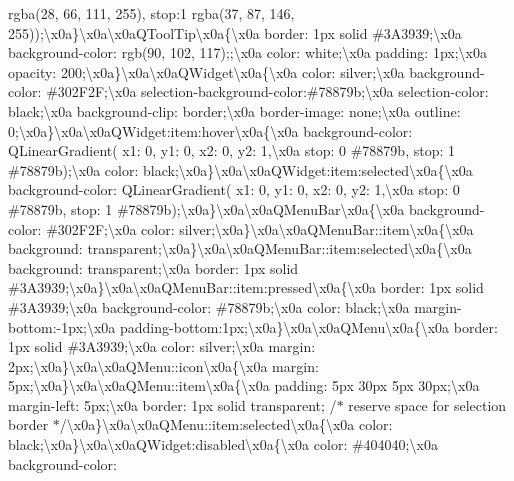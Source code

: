\begin{DoxyCompactItemize}
rgba(28, 66, 111, 255), stop\+:1 rgba(37, 87, 146, 255));\textbackslash{}x0a\}\textbackslash{}x0a\textbackslash{}x0a\+Q\+Tool\+Tip\textbackslash{}x0a\{\textbackslash{}x0a border\+: 1px solid \#3\+A3939;\textbackslash{}x0a background-\/color\+: rgb(90, 102, 117);;\textbackslash{}x0a color\+: white;\textbackslash{}x0a padding\+: 1px;\textbackslash{}x0a opacity\+: 200;\textbackslash{}x0a\}\textbackslash{}x0a\textbackslash{}x0a\+Q\+Widget\textbackslash{}x0a\{\textbackslash{}x0a color\+: silver;\textbackslash{}x0a background-\/color\+: \#302\+F2\+F;\textbackslash{}x0a selection-\/background-\/color\+:\#78879b;\textbackslash{}x0a selection-\/color\+: black;\textbackslash{}x0a background-\/clip\+: border;\textbackslash{}x0a border-\/image\+: none;\textbackslash{}x0a outline\+: 0;\textbackslash{}x0a\}\textbackslash{}x0a\textbackslash{}x0a\+Q\+Widget\+:item\+:hover\textbackslash{}x0a\{\textbackslash{}x0a background-\/color\+: Q\+Linear\+Gradient( x1\+: 0, y1\+: 0, x2\+: 0, y2\+: 1,\textbackslash{}x0a stop\+: 0 \#78879b, stop\+: 1 \#78879b);\textbackslash{}x0a color\+: black;\textbackslash{}x0a\}\textbackslash{}x0a\textbackslash{}x0a\+Q\+Widget\+:item\+:selected\textbackslash{}x0a\{\textbackslash{}x0a background-\/color\+: Q\+Linear\+Gradient( x1\+: 0, y1\+: 0, x2\+: 0, y2\+: 1,\textbackslash{}x0a stop\+: 0 \#78879b, stop\+: 1 \#78879b);\textbackslash{}x0a\}\textbackslash{}x0a\textbackslash{}x0a\+Q\+Menu\+Bar\textbackslash{}x0a\{\textbackslash{}x0a background-\/color\+: \#302\+F2\+F;\textbackslash{}x0a color\+: silver;\textbackslash{}x0a\}\textbackslash{}x0a\textbackslash{}x0a\+Q\+Menu\+Bar\+::item\textbackslash{}x0a\{\textbackslash{}x0a background\+: transparent;\textbackslash{}x0a\}\textbackslash{}x0a\textbackslash{}x0a\+Q\+Menu\+Bar\+::item\+:selected\textbackslash{}x0a\{\textbackslash{}x0a background\+: transparent;\textbackslash{}x0a border\+: 1px solid \#3\+A3939;\textbackslash{}x0a\}\textbackslash{}x0a\textbackslash{}x0a\+Q\+Menu\+Bar\+::item\+:pressed\textbackslash{}x0a\{\textbackslash{}x0a border\+: 1px solid \#3\+A3939;\textbackslash{}x0a background-\/color\+: \#78879b;\textbackslash{}x0a color\+: black;\textbackslash{}x0a margin-\/bottom\+:-\/1px;\textbackslash{}x0a padding-\/bottom\+:1px;\textbackslash{}x0a\}\textbackslash{}x0a\textbackslash{}x0a\+Q\+Menu\textbackslash{}x0a\{\textbackslash{}x0a border\+: 1px solid \#3\+A3939;\textbackslash{}x0a color\+: silver;\textbackslash{}x0a margin\+: 2px;\textbackslash{}x0a\}\textbackslash{}x0a\textbackslash{}x0a\+Q\+Menu\+::icon\textbackslash{}x0a\{\textbackslash{}x0a margin\+: 5px;\textbackslash{}x0a\}\textbackslash{}x0a\textbackslash{}x0a\+Q\+Menu\+::item\textbackslash{}x0a\{\textbackslash{}x0a padding\+: 5px 30px 5px 30px;\textbackslash{}x0a margin-\/left\+: 5px;\textbackslash{}x0a border\+: 1px solid transparent; /$\ast$ reserve space for selection border $\ast$/\textbackslash{}x0a\}\textbackslash{}x0a\textbackslash{}x0a\+Q\+Menu\+::item\+:selected\textbackslash{}x0a\{\textbackslash{}x0a color\+: black;\textbackslash{}x0a\}\textbackslash{}x0a\textbackslash{}x0a\+Q\+Widget\+:disabled\textbackslash{}x0a\{\textbackslash{}x0a color\+: \#404040;\textbackslash{}x0a background-\/color\+: 
\end{DoxyCompactItemize}
